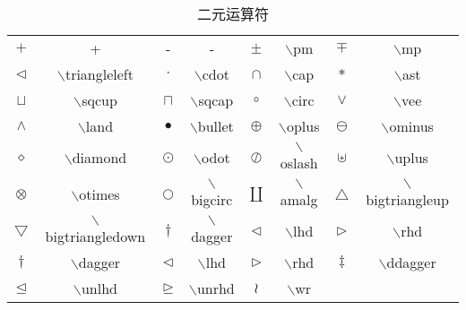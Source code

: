 \documentclass[UTF8]{ctexart}
\begin{document}
\begin{table}[H]
	\begin{center}
		\caption{二元运算符}
		\begin{tabular}{cccccccc}
			
			$+$ & + & - & -  &  $\pm$   & $\backslash$pm  & $\mp$  &  $\backslash$mp  \\
			
			$\triangleleft$  &  $\backslash$triangleleft  &  $\cdot$  & $\backslash$cdot  &  $\cap$  & $\backslash$cap  &  $\ast$  &  $\backslash$ast \\
			
			$\sqcup$ & $\backslash$sqcup &  $\sqcap$  & $\backslash$sqcap   &  $\circ$  & $\backslash$circ &  $\vee$ & $\backslash$vee \\
			
			
			$\land$  &  $\backslash$land  &  $\bullet$  & $\backslash$bullet  &  $\oplus$  & $\backslash$oplus  &  $\ominus$  &  $\backslash$ominus \\
			
			$\diamond$ & $\backslash$diamond &  $\odot$  & $\backslash$odot   &  $\oslash$  & $\backslash$oslash &  $\uplus$ & $\backslash$uplus \\
			
			$\otimes$ & $\backslash$otimes &  $\bigcirc$  & $\backslash$bigcirc   &  $\amalg$  & $\backslash$amalg &  $\bigtriangleup$ & $\backslash$bigtriangleup \\	
			
			$\bigtriangledown$ & $\backslash$bigtriangledown &  $\dagger$  & $\backslash$dagger   &  $\lhd$  & $\backslash$lhd &  $\rhd$ & $\backslash$rhd \\
			
			
			$\dagger$ & $\backslash$dagger &  $\lhd$  & $\backslash$lhd   &  $\rhd$  & $\backslash$rhd &  $\ddagger$ & $\backslash$ddagger \\	
			
			$\unlhd$ & $\backslash$unlhd &  $\unrhd$  & $\backslash$unrhd   &  $\wr$  & $\backslash$wr  \\
	
			
		\end{tabular}
	\end{center}
\end{table}
\end{document}
